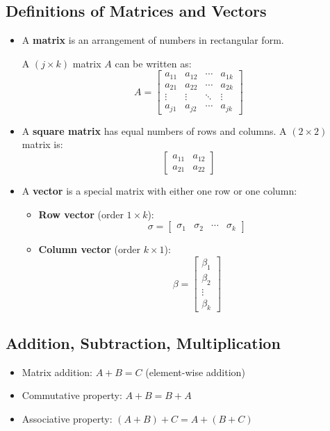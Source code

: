 \documentclass{article}
\begin{document}
\subsection{Definitions of Matrices and Vectors}
\begin{itemize}
    \item A \textbf{matrix} is an arrangement of numbers in rectangular form.
    
    A $(j \times k)$ matrix $A$ can be written as:
    \[
    A = \begin{bmatrix}
        a_{11} & a_{12} & \cdots & a_{1k} \\
        a_{21} & a_{22} & \cdots & a_{2k} \\
        \vdots & \vdots & \ddots & \vdots \\
        a_{j1} & a_{j2} & \cdots & a_{jk}
    \end{bmatrix}
    \]
    
    \item A \textbf{square matrix} has equal numbers of rows and columns. A $(2 \times 2)$ matrix is:
    \[
    \begin{bmatrix}
        a_{11} & a_{12} \\
        a_{21} & a_{22}
    \end{bmatrix}
    \]
    
    \item A \textbf{vector} is a special matrix with either one row or one column:
    \begin{itemize}
        \item \textbf{Row vector} (order $1 \times k$):
        \[
        \sigma = \begin{bmatrix}
            \sigma_1 & \sigma_2 & \cdots & \sigma_k
        \end{bmatrix}
        \]
        
        \item \textbf{Column vector} (order $k \times 1$):
        \[
        \beta = \begin{bmatrix}
            \beta_1 \\
            \beta_2 \\
            \vdots \\
            \beta_k
        \end{bmatrix}
        \]
    \end{itemize}
\end{itemize}

\subsection{Addition, Subtraction, Multiplication}
\begin{itemize}
    \item Matrix addition: $A + B = C$ (element-wise addition)
    \item Commutative property: $A + B = B + A$
    \item Associative property: $(A + B) + C = A + (B + C)$
\end{itemize}
\end{document}
